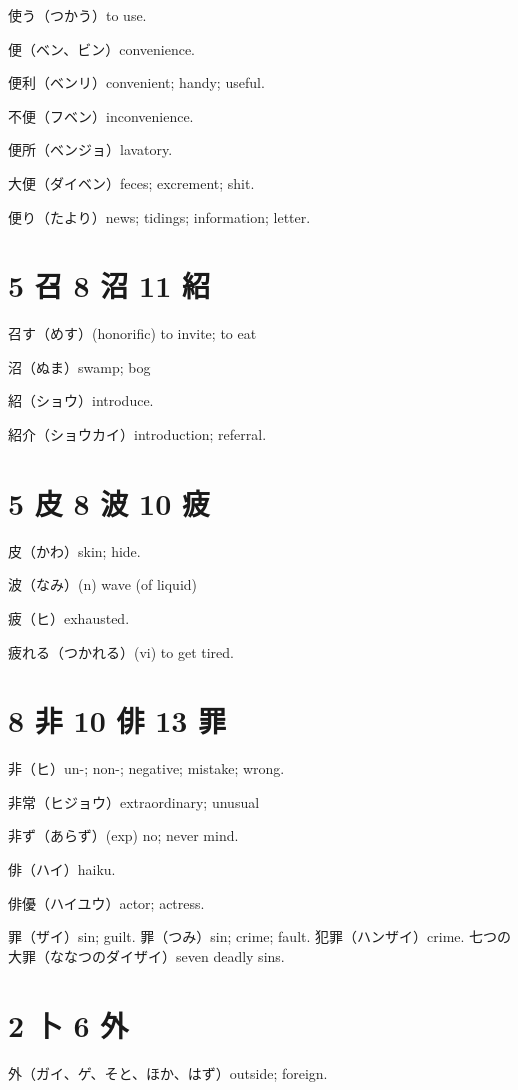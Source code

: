 使う（つかう）to use.

便（ベン、ビン）convenience.

便利（ベンリ）convenient; handy; useful.

不便（フベン）inconvenience.

便所（ベンジョ）lavatory.

大便（ダイベン）feces; excrement; shit.

便り（たより）news; tidings; information; letter.

\section{5 召 8 沼 11 紹}

召す（めす）(honorific) to invite; to eat

沼（ぬま）swamp; bog

紹（ショウ）introduce.

紹介（ショウカイ）introduction; referral.

\section{5 皮 8 波 10 疲}

皮（かわ）skin; hide.

波（なみ）(n) wave (of liquid)

疲（ヒ）exhausted.

疲れる（つかれる）(vi) to get tired.

\section{8 非 10 俳 13 罪}

非（ヒ）un-; non-; negative; mistake; wrong.

非常（ヒジョウ）extraordinary; unusual

非ず（あらず）(exp) no; never mind.

俳（ハイ）haiku.

俳優（ハイユウ）actor; actress.

罪（ザイ）sin; guilt.
罪（つみ）sin; crime; fault.
犯罪（ハンザイ）crime.
七つの大罪（ななつのダイザイ）seven deadly sins.

\section{2 卜 6 外}

外（ガイ、ゲ、そと、ほか、はず）outside; foreign.

